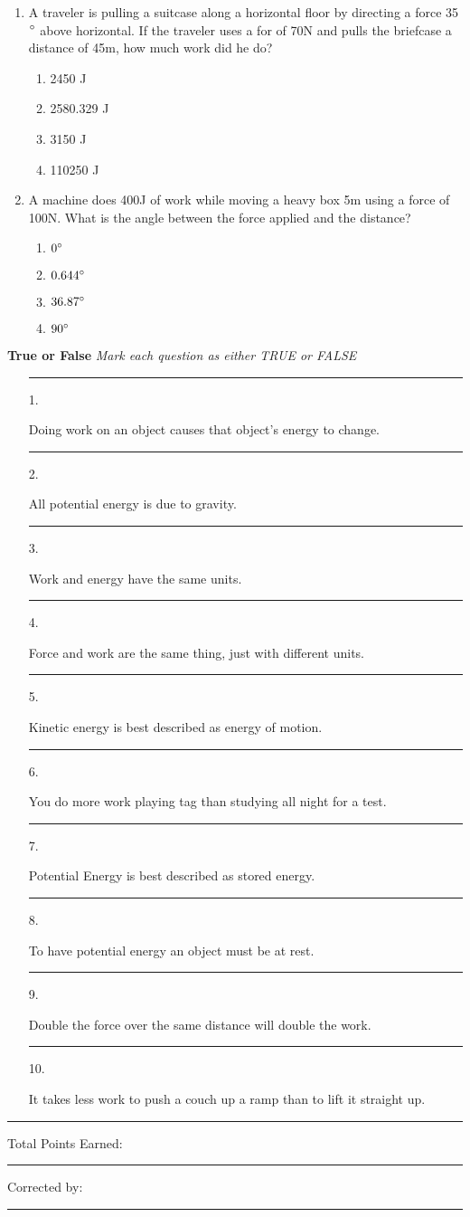 \documentclass[letterpaper, 12pt]{article}
\begin{document}
\begin{enumerate}
	\item A traveler is pulling a suitcase along a horizontal floor by directing a force 35$\degree $ above horizontal.  If the traveler uses a for of 70N and pulls the briefcase a distance of 45m, how much work did he do?
\begin{enumerate}
		\vspace{-.1 in}
	\item 2450 J
	\item 2580.329 J
	\item 3150 J
	\item 110250 J
	
\end{enumerate}


	\item A machine does 400J of work while moving a heavy box 5m using a force of 100N.  What is the angle between the force applied and the distance?
	\begin{enumerate} 
			\vspace{-.1 in}
		\item  $0 \degree $
		\item  $ 0.644 \degree $
		\item  $36.87 \degree $
		\item  $90 \degree $
		
	\end{enumerate}
	

\end{enumerate}
	
	\vspace{1 in} 		
	\textbf{True or False} \textit{Mark each question as either TRUE or FALSE}
	\begin{enumerate}
		\item [\rule{0.4in}{0.01in} 1.] Doing work on an object causes that object's energy to change.
		\item [\rule{0.4in}{0.01in} 2.] All potential energy is due to gravity.
		\item [\rule{0.4in}{0.01in} 3.] Work and energy have the same units.
		\item [\rule{0.4in}{0.01in} 4.] Force and work are the same thing, just with different units.
		\item [\rule{0.4in}{0.01in} 5.] Kinetic energy is best described as energy of motion.
		\item [\rule{0.4in}{0.01in} 6.] You do more work playing tag than studying all night for a test.
		\item [\rule{0.4in}{0.01in} 7.] Potential Energy is best described as stored energy.
		\item [\rule{0.4in}{0.01in} 8.] To have potential energy an object must be at rest.
		\item [\rule{0.4in}{0.01in} 9.] Double the force over the same distance will double the work.
		\item [\rule{0.3in}{0.01in} 10.]  It takes less work to push a couch up a ramp than to lift it straight up.
		
		
		
	\end{enumerate}	


\vspace{2in}
\hrule
\vspace{0.5in}
Total Points Earned: \rule{1in}{0.01in}

\vspace{1in}
Corrected by: \rule{3in}{0.01in}



 
\end{document}
